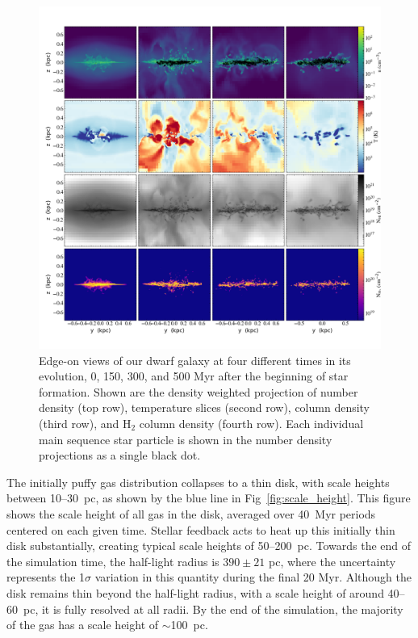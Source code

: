 \documentclass[twocolumn]{aastex61}
\begin{document}
\begin{figure}
\centering
\includegraphics[width=0.975\linewidth]{multiplot_4x4_x.png}
\caption{Edge-on views of our dwarf galaxy at four different times in its evolution, 0, 150, 300, and 500 Myr after the beginning of star formation. Shown are the density weighted projection of number density (top row), temperature slices (second row), 
 column density (third row), and H$_2$ column density (fourth row). Each individual main sequence star particle is shown in the number density projections as a single black dot.}
\label{fig:panel_x}
\end{figure}

The initially puffy gas distribution collapses to a thin disk, with scale heights between 10--30~pc, as shown by the blue line in Fig~\ref{fig:scale_height}. This figure shows the scale height of all gas in the disk, averaged over 40~Myr periods centered on each given time. Stellar feedback acts to heat up this initially thin disk substantially, creating typical scale heights of 50--200~pc. 
  Towards the end of the simulation time, the half-light radius is $390 \pm 21$ pc, where the 
  uncertainty represents the 1$\sigma$ variation in this quantity during the final 20 Myr.
Although the disk remains thin beyond the half-light radius, with a scale height of around 40--60~pc, it is fully resolved at all radii. By the end of the simulation, the majority of the gas has a scale height of $\sim$100~pc. 
\end{document}
